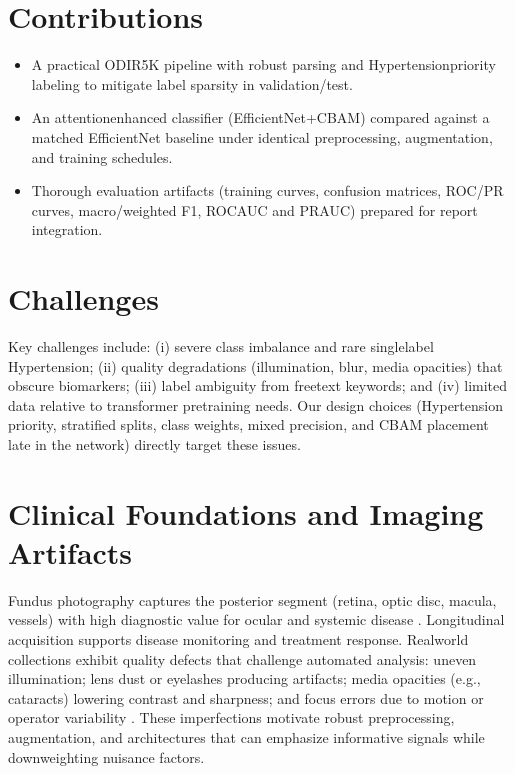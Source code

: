 \section{Contributions}
\begin{itemize}
  \item A practical ODIR\textendash 5K pipeline with robust parsing and Hypertension\textendash priority labeling to mitigate label sparsity in validation/test.
  \item An attention\textendash enhanced classifier (EfficientNet+CBAM) compared against a matched EfficientNet baseline under identical preprocessing, augmentation, and training schedules.
  \item Thorough evaluation artifacts (training curves, confusion matrices, ROC/PR curves, macro/weighted F1, ROC\textendash AUC and PR\textendash AUC) prepared for report integration.
\end{itemize}

\section{Challenges}
Key challenges include: (i) severe class imbalance and rare single\textendash label Hypertension; (ii) quality degradations (illumination, blur, media opacities) that obscure biomarkers; (iii) label ambiguity from free\textendash text keywords; and (iv) limited data relative to transformer pretraining needs. Our design choices (Hypertension priority, stratified splits, class weights, mixed precision, and CBAM placement late in the network) directly target these issues.

\section{Clinical Foundations and Imaging Artifacts}
Fundus photography captures the posterior segment (retina, optic disc, macula, vessels) with high diagnostic value for ocular and systemic disease \cite{docxRef01}. Longitudinal acquisition supports disease monitoring and treatment response. Real\textendash world collections exhibit quality defects that challenge automated analysis: uneven illumination; lens dust or eyelashes producing artifacts; media opacities (e.g., cataracts) lowering contrast and sharpness; and focus errors due to motion or operator variability \cite{docxRef04,docxRef05}. These imperfections motivate robust preprocessing, augmentation, and architectures that can emphasize informative signals while down\textendash weighting nuisance factors.

